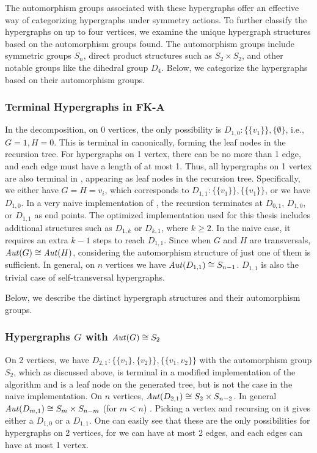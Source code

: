 The automorphism groups associated with these hypergraphs offer an effective way of categorizing hypergraphs under symmetry actions. To further classify the hypergraphs on up to four vertices, we examine the unique hypergraph structures based on the automorphism groups found. The automorphism groups include symmetric groups $S_n$, direct product structures such as $S_2\times S_2$, and other notable groups like the dihedral group $D_4$. Below, we categorize the hypergraphs based on their automorphism groups.

\subsubsection*{Terminal Hypergraphs in FK-A}

In the \FKA{} decomposition, on 0 vertices, the only possibility is $D_{1,0}:\{\{v_1\}\},\{\emptyset\}$, i.e., $G=1,H=0$. This is terminal in \FKA{} canonically, forming the leaf nodes in the recursion tree. For hypergraphs on 1 vertex, there can be no more than 1 edge, and each edge must have a length of at most 1. Thus, all hypergraphs on 1 vertex are also terminal in \FKA, appearing as leaf nodes in the recursion tree. Specifically, we either have $G=H=v_i$, which corresponds to $D_{1,1}:\{\{v_1\}\},\{\{v_1\}\}$, or we have $D_{1,0}$. In a very naive implementation of \FKA, the recursion terminates at $D_{0,1}$, $D_{1,0}$, or $D_{1,1}$ as end points. The optimized implementation used for this thesis includes additional structures such as $D_{1,k}$ or $D_{k,1}$, where $k\geq 2$. In the naive case, it requires an extra $k-1$ steps to reach $D_{1,1}$. Since when $G$ and $H$ are transversals, $\mathit{Aut}(G)\cong\mathit{Aut}(H)$, considering the automorphism structure of just one of them is sufficient. In general, on $n$ vertices we have $\mathit{Aut}(D_{1,1})\cong S_{n-1}$. $D_{1,1}$ is also the trivial case of self-transversal hypergraphs.

Below, we describe the distinct hypergraph structures and their automorphism groups.

\subsubsection*{Hypergraphs $G$ with $\mathit{Aut}(G)\cong S_2$}

On 2 vertices, we have $D_{2,1}:\{\{v_1\},\{v_2\}\},\{\{v_1,v_2\}\}$ with the automorphism group $S_2$, which as discussed above, is terminal in a modified implementation of the algorithm and is a leaf node on the generated tree, but is not the case in the naive implementation. On $n$ vertices, $\mathit{Aut}(D_{2,1})\cong S_2\times S_{n-2}$. In general $\mathit{Aut}(D_{m,1})\cong S_m\times S_{n-m}$ (for $m<n$) . Picking a vertex and recursing on it gives either a $D_{1,0}$ or a $D_{1,1}$. One can easily see that these are the only possibilities for hypergraphs on 2 vertices, for we can have at most 2 edges, and each edges can have at most 1 vertex.

